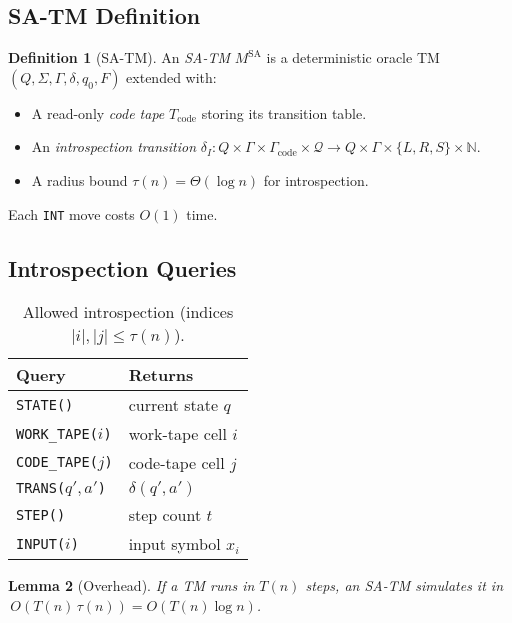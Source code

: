 \documentclass[12pt]{article}
\newcommand{\SA}{\mathrm{SA}}
\theoremstyle{definition}
\newtheorem{definition}{Definition}[section]
\theoremstyle{plain}
\newtheorem{lemma}[definition]{Lemma}
\begin{document}
\subsection{SA-TM Definition}
\begin{definition}[SA-TM]\label{def:satm}
An \emph{SA-TM} \(M^{\SA}\) is a deterministic oracle TM
\((Q,\Sigma,\Gamma,\delta,q_0,F)\) extended with:
\begin{itemize}
  \item A read-only \emph{code tape} \(T_{\text{code}}\) storing its transition table.
  \item An \emph{introspection transition}
    \(\delta_I\colon Q\times\Gamma\times\Gamma_{\text{code}}\times\mathcal Q
      \to Q\times\Gamma\times\{L,R,S\}\times\mathbb N\).
  \item A radius bound \(\tau(n)=\Theta(\log n)\) for introspection.
\end{itemize}
Each \texttt{INT} move costs \(O(1)\) time.
\end{definition}

\subsection{Introspection Queries}
\begin{table}[h]
\centering
\begin{tabular}{@{}ll@{}}
\toprule
\textbf{Query} & \textbf{Returns}\\
\midrule
\texttt{STATE()}                & current state \(q\)\\
\texttt{WORK\_TAPE($i$)}        & work-tape cell \(i\)\\
\texttt{CODE\_TAPE($j$)}        & code-tape cell \(j\)\\
\texttt{TRANS($q',a'$)}         & \(\delta(q',a')\)\\
\texttt{STEP()}                 & step count \(t\)\\
\texttt{INPUT($i$)}             & input symbol \(x_i\)\\
\bottomrule
\end{tabular}
\caption{Allowed introspection (indices \(\lvert i\rvert,\lvert j\rvert\le\tau(n)\)).}
\label{tab:introspect}
\end{table}

\begin{lemma}[Overhead]\label{lem:overhead}
If a TM runs in \(T(n)\) steps, an SA-TM simulates it in 
\(\,O(T(n)\,\tau(n))=O(T(n)\log n)\).
\end{lemma}
\end{document}
